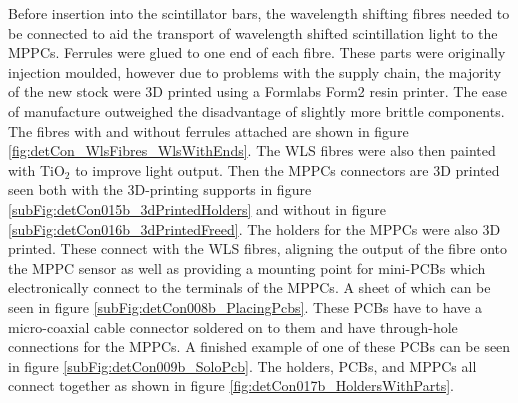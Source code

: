 Before insertion into the scintillator bars, the wavelength shifting fibres needed to be connected to aid the transport of wavelength shifted scintillation light to the MPPCs. Ferrules were glued to one end of each fibre. These parts were originally injection moulded, however due to problems with the supply chain, the majority of the new stock were 3D printed using a Formlabs Form2 resin printer. The ease of manufacture outweighed the disadvantage of slightly more brittle components. The fibres with and without ferrules attached are shown in figure \ref{fig:detCon_WlsFibres_WlsWithEnds}. The WLS fibres were also then painted with TiO$_2$ to improve light output. Then the MPPCs connectors are 3D printed seen both with the 3D-printing supports in figure \ref{subFig:detCon015b_3dPrintedHolders} and without in figure \ref{subFig:detCon016b_3dPrintedFreed}. The holders for the MPPCs were also 3D printed. These connect with the WLS fibres, aligning the output of the fibre onto the MPPC sensor as well as providing a mounting point for mini-PCBs which electronically connect to the terminals of the MPPCs. A sheet of which can be seen in figure \ref{subFig:detCon008b_PlacingPcbs}. These PCBs have to have a micro-coaxial cable connector soldered on to them and have through-hole connections for the MPPCs. A finished example of one of these PCBs can be seen in figure \ref{subFig:detCon009b_SoloPcb}. The holders, PCBs, and MPPCs all connect together as shown in figure \ref{fig:detCon017b_HoldersWithParts}. 

